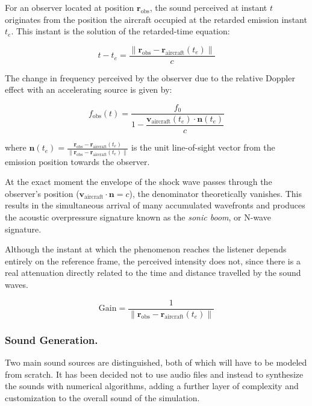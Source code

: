 \documentclass[10.5pt]{article}
\begin{document}
	For an observer located at position $\mathbf{r}_{\text{obs}}$, the sound perceived at instant $t$ originates from the position the aircraft occupied at the retarded emission instant $t_e$. This instant is the solution of the retarded-time equation:
	
	\begin{equation*}
		t - t_e = \frac{\|\mathbf{r}_{\text{obs}} - \mathbf{r}_{\text{aircraft}}(t_e)\|}{c}
	\end{equation*}
	
	The change in frequency perceived by the observer due to the relative Doppler effect with an accelerating source is given by:
	
	\begin{equation*}
		f_{\text{obs}}(t) = \frac{f_0}{1 - \dfrac{\mathbf{v}_{\text{aircraft}}(t_e) \cdot \mathbf{n}(t_e)}{c}}
	\end{equation*}
	
	where $\mathbf{n}(t_e) = \frac{\mathbf{r}_{\text{obs}} - \mathbf{r}_{\text{aircraft}}(t_e)}{\|\mathbf{r}_{\text{obs}} - \mathbf{r}_{\text{aircraft}}(t_e)\|}$ is the unit line-of-sight vector from the emission position towards the observer.
	
	At the exact moment the envelope of the shock wave passes through the observer's position ($\mathbf{v}_{\text{aircraft}} \cdot \mathbf{n} = c$), the denominator theoretically vanishes. This results in the simultaneous arrival of many accumulated wavefronts and produces the acoustic overpressure signature known as the \textit{sonic boom}, or N-wave signature.
	
	Although the instant at which the phenomenon reaches the listener depends entirely on the reference frame, the perceived intensity does not, since there is a real attenuation directly related to the time and distance travelled by the sound waves.
	
	\begin{equation*}
		\text{Gain} = \frac{1}{\|\mathbf{r}_{\text{obs}} - \mathbf{r}_{\text{aircraft}}(t_e)\|}
	\end{equation*}
	
	
	\subsubsection{Sound Generation.}
	
	Two main sound sources are distinguished, both of which will have to be modeled from scratch. It has been decided not to use audio files and instead to synthesize the sounds with numerical algorithms, adding a further layer of complexity and customization to the overall sound of the simulation.
	
\end{document}
